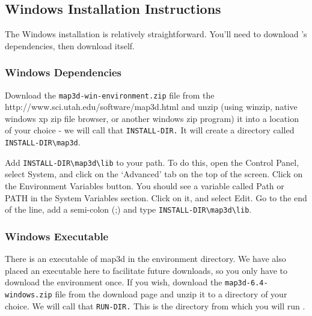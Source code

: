 \subsection{Windows Installation Instructions}
\label{sec:windows-install}

The Windows installation is relatively straightforward.  You'll need to 
download \map{}'s dependencies, then download \map{} itself.

\subsubsection{Windows Dependencies}

Download the \texttt{map3d-win-environment.zip} file from the \map{}
{http://www.sci.utah.edu/software/map3d.html} and unzip (using winzip,
native windows xp zip file browser, or another windows zip program) it into a location
of your choice - we will call that \texttt{INSTALL-DIR.}  It will create a
directory called \verb|INSTALL-DIR\map3d|.

Add \verb|INSTALL-DIR\map3d\lib| to your path.  To do this, open the
Control Panel, select System, and click on the `Advanced' tab on the top of
the screen.  Click on the Environment Variables button.  You should see a
variable called Path or PATH in the System Variables section.  Click on it,
and select Edit.  Go to the end of the line, add a semi-colon (;) and type
\verb|INSTALL-DIR\map3d\lib|.

\subsubsection{Windows Executable}

There is an executable of map3d in the environment directory.  We have also
placed an executable here to facilitate future downloads, so you only have
to download the environment once.  If you wish, download the
\texttt{map3d-6.4-windows.zip} file from the \map{} download page and unzip
it to a directory of your choice.  We will call that \texttt{RUN-DIR.} This
is the directory from which you will run \map{}.



